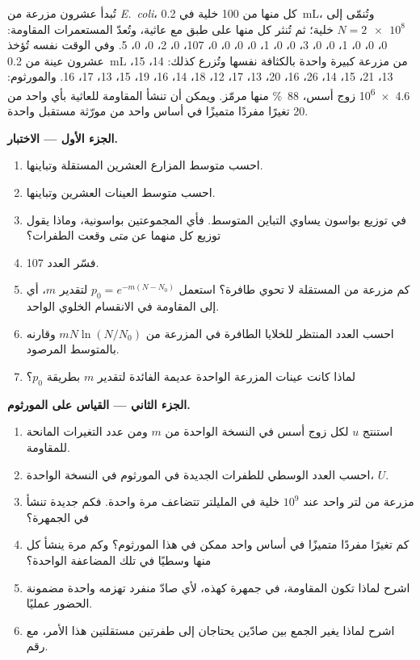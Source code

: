 \begin{problem}
\label{pb:b2:genome-diversification:1}
تُبدأ عشرون مزرعة من \emph{E.~coli}، كل منها من \num{100} خلية في
\qty{0.2}{mL}، وتُنمّى إلى $N = \qty{2e8}{}$ خلية؛ ثم تُنثر كل منها
على طبق مع عاثية، وتُعدّ المستعمرات المقاومة: 0، 0، 0، 1، 0، 0، 3،
0، 0، 1، 0، 0، 0، 0، 107، 0، 2، 0، 0، 5. وفي الوقت نفسه تُؤخذ عشرون
عينة من \qty{0.2}{mL} من مزرعة كبيرة واحدة بالكثافة نفسها وتُزرع
كذلك: 14، 15، 13، 21، 15، 14، 26، 16، 20، 13، 17، 12، 18، 14، 16،
19، 15، 13، 17، 16. والمورثوم: \qty{4.6e6}{} زوج أسس، \qty{88}{\%}
منها مرمّز. ويمكن أن تنشأ المقاومة للعاثية بأي واحد من \num{20}
تغيرًا مفردًا متميزًا في أساس واحد من مورّثة مستقبل واحدة.

\medskip
\noindent\textbf{الجزء الأول --- الاختبار.}
\begin{enumerate}
  \item احسب متوسط المزارع العشرين المستقلة وتباينها.
  \item احسب متوسط العينات العشرين وتباينها.
  \item في توزيع بواسون يساوي التباين المتوسط. فأي المجموعتين
        بواسونية، وماذا يقول توزيع كل منهما عن \emph{متى} وقعت
        الطفرات؟
  \item فسّر العدد 107.
  \item كم مزرعة من المستقلة لا تحوي طافرة؟ استعمل
        $p_0 = e^{-m(N - N_0)}$ لتقدير $m$، أي  إلى
        المقاومة في الانقسام الخلوي الواحد.
  \item احسب العدد المنتظر للخلايا الطافرة في المزرعة من
        $mN\ln(N/N_0)$ وقارنه بالمتوسط المرصود.
  \item لماذا كانت عينات المزرعة الواحدة عديمة الفائدة لتقدير $m$
        بطريقة $p_0$؟
\end{enumerate}

\medskip
\noindent\textbf{الجزء الثاني --- القياس على المورثوم.}
\begin{enumerate}[resume]
  \item استنتج  $u$ لكل زوج أسس في النسخة الواحدة من $m$
        ومن عدد التغيرات المانحة للمقاومة.
  \item احسب العدد الوسطي للطفرات الجديدة في المورثوم في النسخة
        الواحدة، $U$.
  \item مزرعة من لتر واحد عند $10^{9}$ خلية في المليلتر تتضاعف مرة
        واحدة. فكم  جديدة تنشأ في الجمهرة؟
  \item كم تغيرًا مفردًا متميزًا في أساس واحد ممكن في هذا المورثوم؟
        وكم مرة ينشأ كل منها وسطيًا في تلك المضاعفة الواحدة؟
  \item اشرح لماذا تكون المقاومة، في جمهرة كهذه، لأي صادّ منفرد
        تهزمه  واحدة مضمونة الحضور عمليًا.
  \item اشرح لماذا يغير الجمع بين صادّين يحتاجان إلى طفرتين
        مستقلتين هذا الأمر، مع رقم.
\end{enumerate}


\end{problem}
